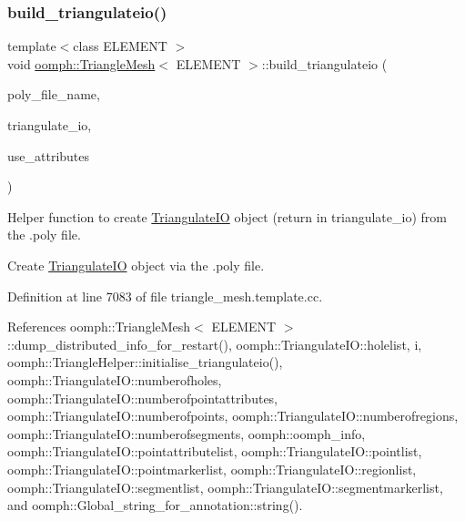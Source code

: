 \mbox{\label{classoomph_1_1TriangleMesh_a1b18773cfdc79964dc7ae58dd11c2862}} 
\subsubsection{\texorpdfstring{build\+\_\+triangulateio()}{build\_triangulateio()}}
{\footnotesize\ttfamily template$<$class E\+L\+E\+M\+E\+NT $>$ \\
void \hyperlink{classoomph_1_1TriangleMesh}{oomph\+::\+Triangle\+Mesh}$<$ E\+L\+E\+M\+E\+NT $>$\+::build\+\_\+triangulateio (\begin{DoxyParamCaption}\item[{const std\+::string \&}]{poly\+\_\+file\+\_\+name,  }\item[{\hyperlink{structoomph_1_1TriangulateIO}{Triangulate\+IO} \&}]{triangulate\+\_\+io,  }\item[{bool \&}]{use\+\_\+attributes }\end{DoxyParamCaption})\hspace{0.3cm}{\ttfamily [protected]}}



Helper function to create \hyperlink{structoomph_1_1TriangulateIO}{Triangulate\+IO} object (return in triangulate\+\_\+io) from the .poly file. 

Create \hyperlink{structoomph_1_1TriangulateIO}{Triangulate\+IO} object via the .poly file. 

Definition at line 7083 of file triangle\+\_\+mesh.\+template.\+cc.



References oomph\+::\+Triangle\+Mesh$<$ E\+L\+E\+M\+E\+N\+T $>$\+::dump\+\_\+distributed\+\_\+info\+\_\+for\+\_\+restart(), oomph\+::\+Triangulate\+I\+O\+::holelist, i, oomph\+::\+Triangle\+Helper\+::initialise\+\_\+triangulateio(), oomph\+::\+Triangulate\+I\+O\+::numberofholes, oomph\+::\+Triangulate\+I\+O\+::numberofpointattributes, oomph\+::\+Triangulate\+I\+O\+::numberofpoints, oomph\+::\+Triangulate\+I\+O\+::numberofregions, oomph\+::\+Triangulate\+I\+O\+::numberofsegments, oomph\+::oomph\+\_\+info, oomph\+::\+Triangulate\+I\+O\+::pointattributelist, oomph\+::\+Triangulate\+I\+O\+::pointlist, oomph\+::\+Triangulate\+I\+O\+::pointmarkerlist, oomph\+::\+Triangulate\+I\+O\+::regionlist, oomph\+::\+Triangulate\+I\+O\+::segmentlist, oomph\+::\+Triangulate\+I\+O\+::segmentmarkerlist, and oomph\+::\+Global\+\_\+string\+\_\+for\+\_\+annotation\+::string().



